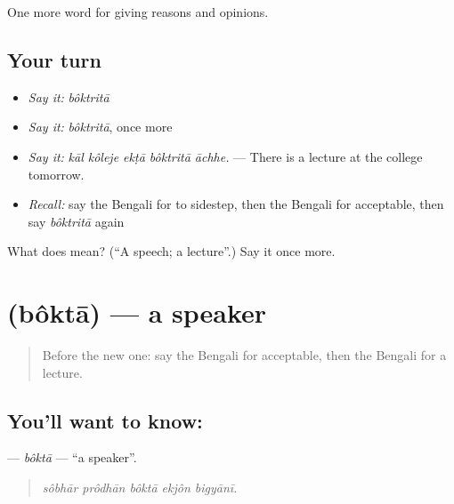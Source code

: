 \begin{grammarlens}[title={What you've built}]
One more word for giving reasons and opinions.
\end{grammarlens}

\subsection*{Your turn}
\begin{itemize}
\raggedright
  \item \emph{Say it:} \emph{bôktritā}
  \item \emph{Say it:} \emph{bôktritā}, once more
  \item \emph{Say it:} \emph{kāl kôleje ekṭā bôktritā āchhe.} — There is a lecture at the college tomorrow.
  \item \emph{Recall:} say the Bengali for to sidestep, then the Bengali for acceptable, then say \emph{bôktritā} again
\end{itemize}

\begin{tcolorbox}[breakable,colback=teal!4,colframe=teal!35!black,title={Before you move on}]
What does  mean? (\textquotedblleft{}A speech; a lecture\textquotedblright{}.) Say it once more.
\end{tcolorbox}
\section[\texorpdfstring{\bn{বক্তা} (bôktā)}{বক্তা (bôktā)}]{ (bôktā) — a speaker}

\label{lesson:BN-C360-bokta}



\begin{quote}
Before the new one: say the Bengali for acceptable, then the Bengali for a lecture.
\end{quote}

\subsection*{You'll want to know: }
\textbf{} — \emph{bôktā} — \textquotedblleft{}a speaker\textquotedblright{}.

\begin{quote}
    
\end{quote}

\begin{quote}
\emph{sôbhār prôdhān bôktā ekjôn bigyānī.}
\end{quote}

